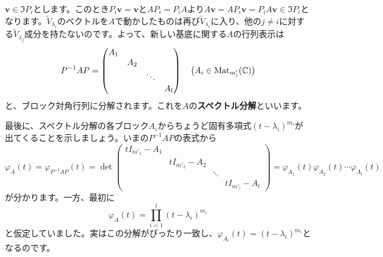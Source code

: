 $\bm{v} \in \Im P_i$とします。このとき$P_i \bm{v} = \bm{v}$と$A P_i = P_i A$より$A \bm{v} = A P_i \bm{v} = P_i A \bm{v} \in \Im P_i$となります。$\tilde{V}_{\lambda_i}$のベクトルを$A$で動かしたものは再び$\tilde{V}_{\lambda_i}$に入り、他の$j \neq i$に対する$\tilde{V}_{\lambda_j}$成分を持たないのです。よって、新しい基底に関する$A$の行列表示は
\[
P^{-1} A P = 
\begin{pmatrix}
A_1 \\
& A_2 \\
& & \ddots \\
& & & A_l
\end{pmatrix}
\quad \bigl(A_i \in \operatorname{Mat}_{m'_i}(\mathbb{C})\bigr)
\]
と、ブロック対角行列に分解されます。これを$A$の\textbf{スペクトル分解}といいます。

最後に、スペクトル分解の各ブロック$A_i$からちょうど固有多項式$(t - \lambda_i)^{m_i}$が出てくることを示しましょう。いまの$P^{-1} A P$の表式から
\[
\varphi_{A}(t) = \varphi_{P^{-1} A P}(t) = \det
\begin{pmatrix}
tI_{m'_1} - A_1 \\
& tI_{m'_2} - A_2 \\
& & \ddots \\
& & & tI_{m'_l} - A_l
\end{pmatrix}
= \varphi_{A_1}(t) \varphi_{A_2}(t) \cdots \varphi_{A_l}(t)
\]
が分かります。一方、最初に
\[
\varphi_A(t) = \prod_{i = 1}^l (t - \lambda_i)^{m_i}
\]
と仮定していました。実はこの分解がぴったり一致し、$\varphi_{A_i}(t) = (t - \lambda_i)^{m_i}$となるのです。

